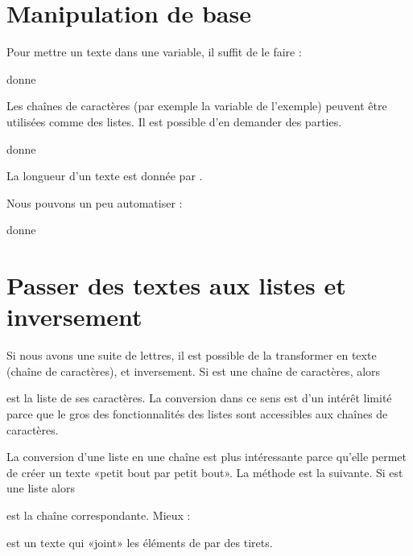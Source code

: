 \section{Manipulation de base}

Pour mettre un texte dans une variable, il suffit de le faire :


donne


Les chaînes de caractères (par exemple la variable  de l'exemple) peuvent être utilisées comme des listes. Il est possible d'en demander des parties.


donne


La longueur d'un texte est donnée par .

Nous pouvons un peu automatiser :

donne


\section{Passer des textes aux listes et inversement}

Si nous avons une suite de lettres, il est possible de la transformer en texte (chaîne de caractères), et inversement. Si  est une chaîne de caractères, alors
\begin{quote}
\end{quote}
est la liste de ses caractères. La conversion dans ce sens est d'un intérêt limité parce que le gros des fonctionnalités des listes sont accessibles aux chaînes de caractères.

La conversion d'une liste en une chaîne est plus intéressante parce qu'elle permet de créer un texte «petit bout par petit bout». La méthode est la suivante. Si  est une liste alors
\begin{quote}
\end{quote}
est la chaîne correspondante. Mieux : 
\begin{quote}
\end{quote}
est un texte qui «joint» les éléments de  par des tirets.


